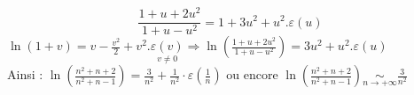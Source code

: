 {\begin{enumerate}
		$$
		\frac{1+u+2 u^{2}}{1+u-u^{2}}=1+3 u^{2}+u^{2} . \varepsilon(u)
		$$
		$\ln (1+v)=v-\frac{v^{2}}{2}+v^{2} . \underset{v \neq 0}{\varepsilon(v)} \Rightarrow \ln \left(\frac{1+u+2 u^{2}}{1+u-u^{2}}\right)=3 u^{2}+u^{2} . \varepsilon(u)$\\
		Ainsi : $\ln \left(\frac{n^{2}+n+2}{n^{2}+n-1}\right)=\frac{3}{n^{2}}+\frac{1}{n^{2}} \cdot \varepsilon\left(\frac{1}{n}\right)$ ou encore $\ln \left(\frac{n^{2}+n+2}{n^{2}+n-1}\right) \underset{n \rightarrow+\infty}{\sim} \frac{3}{n^{2}}$
\end{enumerate}
}
